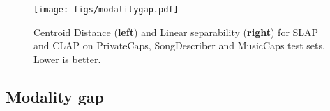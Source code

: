 \documentclass{article}
\begin{document}

\begin{figure}
    \texttt{[image: figs/modalitygap.pdf]}
    \caption{Centroid Distance (\textbf{left}) and Linear separability (\textbf{right}) for SLAP and CLAP on PrivateCaps, SongDescriber and MusicCaps test sets. Lower is better.}
    \label{fig:modalitygap}
\end{figure}


\subsection{Modality gap}\label{modalitygap}
\end{document}
